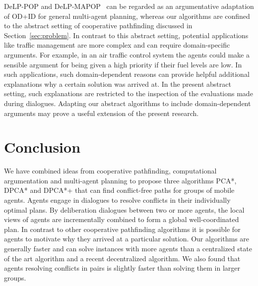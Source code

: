 \textsf{DeLP-POP} and \textsf{DeLP-MAPOP}~\cite{pardo2011,ferrando2012} can be regarded as an argumentative adaptation of OD+ID for general multi-agent planning, whereas our algorithms are confined to the abstract setting of cooperative pathfinding discussed in Section~\ref{sec:problem}.
%
In contrast to this abstract setting, potential applications like traffic management are more complex and 
can require domain-specific arguments. For example, in an air traffic control 
system the agents could make a sensible argument for being given a high priority if their fuel 
levels are low.
In such applications, such domain-dependent reasons can provide helpful additional explanations why a certain solution was 
arrived at. In the present abstract setting, such explanations are restricted to the inspection of the evaluations 
made during dialogues. Adapting our abstract algorithms to include domain-dependent arguments may prove a useful extension of the present research.

\section{Conclusion}
We have combined ideas from cooperative pathfinding, computational 
argumentation and multi-agent planning to propose three algorithms PCA*, DPCA* and DPCA*+ that can 
find conflict-free paths for groups of mobile agents. Agents engage in 
dialogues to resolve conflicts in their individually optimal plans. By deliberation dialogues between two or more agents, the local views of 
agents are incrementally combined to form a global well-coordinated plan.
In contrast to other cooperative pathfinding algorithms it is possible for 
agents to motivate why they arrived at a particular solution.
Our algorithms are generally faster and can solve instances with more agents than a 
centralized state of the art algorithm and a recent decentralized algorithm.
We also found that agents resolving conflicts in pairs is slightly faster than 
solving them in larger groups.
